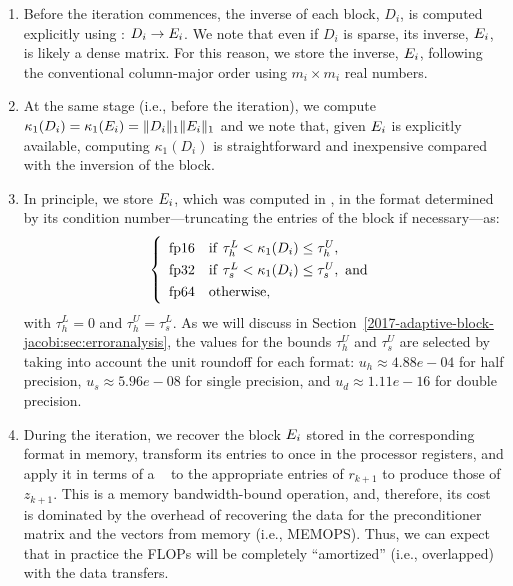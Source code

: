 \begin{enumerate} 
    \item Before the iteration
    commences, the inverse of each block, $D_i$, is computed explicitly using 
    \fpd: 
    $D_i \rightarrow E_i$. We note that even if $D_i$ is
    sparse, its inverse, $E_i$, is likely a dense matrix. For this reason, we 
    store
    the inverse, $E_i$, following the conventional column-major order using
    $m_i\times m_i$ real numbers. 
    \item At the same stage (i.e., before the
    iteration),
    we compute $\kappa_1(D_i) = \kappa_1(E_i) =  \|D_{i}\|_1 \|E_{i}\|_1$
        and we note
    that, given $E_i$ is explicitly available, computing
    $\kappa_1(D_i)$ is straightforward and inexpensive compared with the
    inversion of the block. 
    \item In principle, we store $E_i$, which was computed in \fpd, in the
    format determined by its condition number---truncating the entries of the
    block if necessary---as: 
    \begin{equation} \label{2017-adaptive-block-jacobi:eqn:thresholds} \left\{
    \renewcommand{\arraystretch}{1.3} \begin{array}{l} \mathrm{\fph \quad
        if}~\tau_h^L < \kappa_1(D_i) \leq \tau_h^U,\\ \mathrm{\fps \quad
        if}~\tau_s^L < \kappa_1(D_i) \leq \tau_s^U,~\mathrm{and}\\ \mathrm{\fpd
        \quad otherwise}, \end{array} \right. 
    \end{equation} 
    with $\tau_h^L = 0$ and $\tau_h^U = \tau_s^L$. As we will discuss in 
    Section~\ref{2017-adaptive-block-jacobi:sec:erroranalysis}, the
    values for the bounds $\tau_h^U$ and $\tau_s^U$ are selected by taking into
    account the unit roundoff for each format: $u_h \approx 4.88e-04$ for half 
    precision, $u_s \approx 5.96e-08$ for 
    single precision, and $u_d\approx 1.11e-16$ for double precision. 
    \item During the iteration, we recover the block $E_i$ stored in the 
    corresponding
    format in memory, transform its entries to \fpd once in
    the processor registers, and apply it in terms of a \fpd~\gemv
    to the appropriate entries of $r_{k+1}$ to produce those of $z_{k+1}$.
    This is a memory bandwidth-bound operation, and, therefore, its cost is 
    dominated
    by the overhead of recovering the data for the preconditioner matrix and the
    vectors from memory (i.e., MEMOPS). Thus, we can expect that in
    practice the FLOPs will be completely ``amortized'' (i.e., overlapped) with
    the data transfers. 
\end{enumerate}

